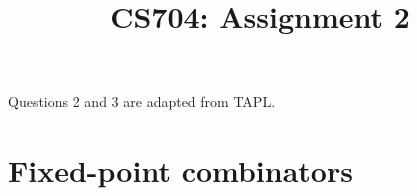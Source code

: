 \documentclass[11pt, oneside]{article}   	%
\title{CS704: Assignment 2}
\author{}
\date{}							%
\begin{document}
\maketitle
Questions 2 and 3 are adapted from TAPL.





\section{Fixed-point combinators}
\end{document}
